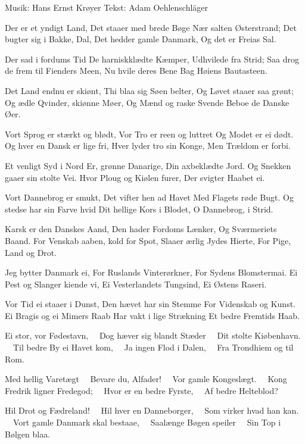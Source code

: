 {Musik: Hans Ernst Krøyer}
{Tekst: Adam Oehlenschläger}
{
Der er et yndigt Land,
Det staaer med brede Bøge
Nær salten Østerstrand;
Det bugter sig i Bakke, Dal,
Det hedder gamle Danmark,
Og det er Freias Sal.

Der sad i fordums Tid
De harniskklædte Kæmper,
Udhvilede fra Strid;
Saa drog de frem til Fienders Meen,
Nu hvile deres Bene
Bag Høiens Bautasteen.

Det Land endnu er skiønt,
Thi blaa sig Søen belter,
Og Løvet staaer saa grønt;
Og ædle Qvinder, skiønne Møer,
Og Mænd og raske Svende
Beboe de Danske Øer.

Vort Sprog er stærkt og blødt,
Vor Tro er reen og luttret
Og Modet er ei dødt.
Og hver en Dansk er lige fri,
Hver lyder tro sin Konge,
Men Trældom er forbi.

Et venligt Syd i Nord
Er, grønne Danarige,
Din axbeklædte Jord.
Og Snekken gaaer sin stolte Vei.
Hvor Ploug og Kiølen furer,
Der svigter Haabet ei.

Vort Dannebrog er smukt,
Det vifter hen ad Havet
Med Flagets røde Bugt.
Og stedse har sin Farve hvid
Dit hellige Kors i Blodet,
O Dannebrog, i Strid.

Karsk er den Danskes Aand,
Den hader Fordoms Lænker,
Og Sværmeriets Baand.
For Venskab aaben, kold for Spot,
Slaaer ærlig Jydes Hierte,
For Pige, Land og Drot.

Jeg bytter Danmark ei,
For Ruslands Vinterørkner,
For Sydens Blomstermai.
Ei Pest og Slanger kiende vi,
Ei Vesterlandets Tungsind,
Ei Østens Raseri.

Vor Tid ei staaer i Dunst,
Den hævet har sin Stemme
For Videnskab og Kunst.
Ei Bragis og ei Mimers Raab
Har vakt i lige Strækning
Et bedre Fremtids Haab.

Ei stor, vor Fødestavn,
\ \ Dog hæver sig blandt Stæder
\ \ Dit stolte Kiøbenhavn.
\ \ Til bedre By ei Havet kom,
\ \ Ja ingen Flod i Dalen,
\ \ Fra Trondhiem og til Rom.

Med hellig Varetægt
\ \ Bevare du, Alfader!
\ \ Vor gamle Kongeslægt.
\ \ Kong Fredrik ligner Fredegod;
\ \ Hvor er en bedre Fyrste,
\ \ Af bedre Helteblod?

Hil Drot og Fædreland!
\ \ Hil hver en Danneborger,
\ \ Som virker hvad han kan.
\ \ Vort gamle Danmark skal bestaae,
\ \ Saalænge Bøgen speiler
\ \ Sin Top i Bølgen blaa.
}